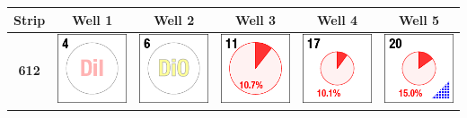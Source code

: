 \begin{table}
\begin{center}
\begin{tabular}{cccccc}
Strip & Well 1 & Well 2 & Well 3 & Well 4 & Well 5\\
\hline
\textbf{612} & \includegraphics{./images/ace_m2_sample_tiles/sample04.png} & \includegraphics{./images/ace_m2_sample_tiles/sample06.png} & \includegraphics{./images/ace_m2_sample_tiles/sample11.png} & \includegraphics{./images/ace_m2_sample_tiles/sample17.png} & \includegraphics{./images/ace_m2_sample_tiles/sample20.png}\\

\end{tabular}
\end{center}
\end{table}
